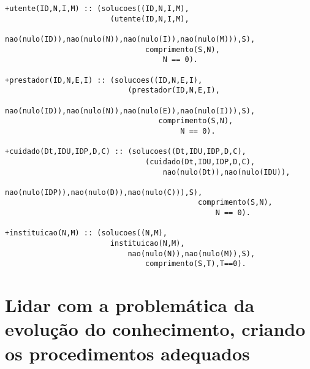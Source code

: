 \documentclass{report}
\begin{document}
\begin{verbatim}
+utente(ID,N,I,M) :: (solucoes((ID,N,I,M),
                        (utente(ID,N,I,M),
                            nao(nulo(ID)),nao(nulo(N)),nao(nulo(I)),nao(nulo(M))),S),
                                comprimento(S,N),
                                    N == 0).

+prestador(ID,N,E,I) :: (solucoes((ID,N,E,I),
                            (prestador(ID,N,E,I),
                                nao(nulo(ID)),nao(nulo(N)),nao(nulo(E)),nao(nulo(I))),S),
                                   comprimento(S,N),
                                        N == 0).

+cuidado(Dt,IDU,IDP,D,C) :: (solucoes((Dt,IDU,IDP,D,C),
                                (cuidado(Dt,IDU,IDP,D,C),
                                    nao(nulo(Dt)),nao(nulo(IDU)),
                                        nao(nulo(IDP)),nao(nulo(D)),nao(nulo(C))),S),
                                            comprimento(S,N),
                                                N == 0).

+instituicao(N,M) :: (solucoes((N,M), 
                        instituicao(N,M), 
                            nao(nulo(N)),nao(nulo(M)),S),
                                comprimento(S,T),T==0).

\end{verbatim}




























\section{Lidar com a problemática da evolução do conhecimento, criando os procedimentos adequados}
\end{document}
